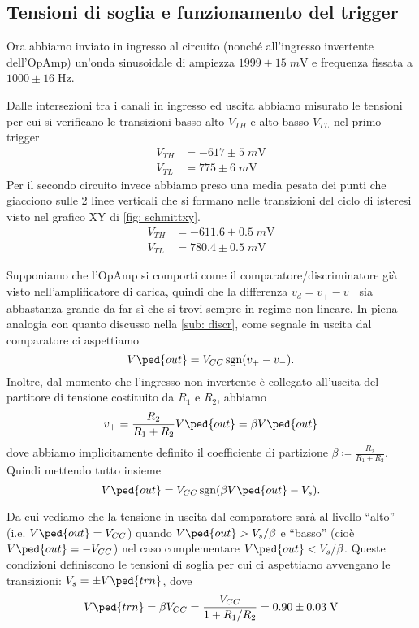 \documentclass[10pt, a4paper, italian]{article}
\begin{document}
\subsection{Tensioni di soglia e funzionamento del trigger}
Ora abbiamo inviato in ingresso al circuito (nonché all'ingresso invertente
dell'OpAmp) un'onda sinusoidale di ampiezza
$1999 \pm 15 \; \si{m\V}$ e frequenza fissata a $1000 \pm 16 \; \si{\Hz}$.

Dalle intersezioni tra i canali in ingresso ed uscita abbiamo misurato le
tensioni per cui si verificano le transizioni basso-alto $V_{TH}$ e alto-basso
$V_{TL}$ nel primo trigger
\begin{align*}
V_{TH} &= -617 \pm 5 \; \si{m\V} \\
V_{TL} &= 775 \pm 6 \; \si{m\V}
\end{align*}
Per il secondo circuito invece abbiamo preso una media pesata dei punti che
giacciono sulle 2 linee verticali che si formano nelle transizioni del ciclo
di isteresi visto nel grafico XY di \cref{fig: schmittxy}.
\begin{align*}
V_{TH} &= -611.6 \pm 0.5 \; \si{m\V} \\
V_{TL} &= 780.4 \pm 0.5 \; \si{m\V}
\end{align*}

Supponiamo che l'OpAmp si comporti come il comparatore/discriminatore già
visto nell'amplificatore di carica, quindi che la differenza
$v_d = v_+ - v_- $ sia abbastanza grande da far sì che si trovi sempre in
regime non lineare. In piena analogia con quanto discusso nella
\cref{sub: discr}, come segnale in uscita dal comparatore ci aspettiamo
\[
V\ped{out} = V_{CC} \sgn(v_+ - v_-)
.\]
Inoltre, dal momento che l'ingresso non-invertente è collegato all'uscita del
partitore di tensione costituito da $R_1$ e $R_2$, abbiamo
\[
v_+ = \frac{R_2}{R_1 + R_2} V \ped{out} = \beta V\ped{out}
\]
dove abbiamo implicitamente definito il coefficiente di partizione
$\beta \coloneqq \frac{R_2}{R_1 + R_2}$. Quindi mettendo tutto insieme
\[
V\ped{out} = V_{CC} \sgn(\beta V\ped{out} - V_s)
.\]

Da cui vediamo che la tensione in uscita dal comparatore sarà al livello
``alto'' (i.e. $V\ped{out} = V_{CC}$) quando $V\ped{out} > V_s/\beta$ e
``basso'' (cioè $V\ped{out} = -V_{CC}$) nel caso complementare
$V\ped{out} < V_s/\beta$. Queste condizioni definiscono le tensioni di soglia
per cui ci aspettiamo avvengano le transizioni:
$V_s = \pm V\ped{trn}$, dove
\begin{equation}
V\ped{trn} = \beta V_{CC} = \frac{V_{CC}}{1 + R_1/R_2} =
0.90 \pm 0.03 \; \si{\V}
\end{equation}
\end{document}
